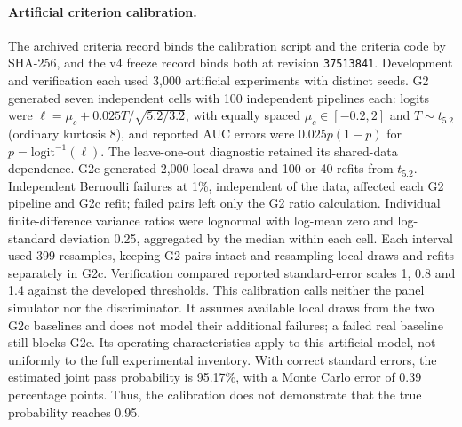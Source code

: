 \paragraph{Artificial criterion calibration.}\label{supp:gate-calibration}
The archived criteria record binds the calibration script and the criteria code by SHA-256, and the v4 freeze record binds both at revision \texttt{37513841}. Development and verification each used 3,000 artificial experiments with distinct seeds. G2 generated seven independent cells with 100 independent pipelines each: logits were $\ell=\mu_c+0.025T/\sqrt{5.2/3.2}$, with equally spaced $\mu_c\in[-0.2,2]$ and $T\sim t_{5.2}$ (ordinary kurtosis 8), and reported AUC errors were $0.025p(1-p)$ for $p=\mathrm{logit}^{-1}(\ell)$. The leave-one-out diagnostic retained its shared-data dependence. G2c generated 2,000 local draws and 100 or 40 refits from $t_{5.2}$. Independent Bernoulli failures at 1\%, independent of the data, affected each G2 pipeline and G2c refit; failed pairs left only the G2 ratio calculation. Individual finite-difference variance ratios were lognormal with log-mean zero and log-standard deviation 0.25, aggregated by the median within each cell. Each interval used 399 resamples, keeping G2 pairs intact and resampling local draws and refits separately in G2c. Verification compared reported standard-error scales 1, 0.8 and 1.4 against the developed thresholds. This calibration calls neither the panel simulator nor the discriminator. It assumes available local draws from the two G2c baselines and does not model their additional failures; a failed real baseline still blocks G2c. Its operating characteristics apply to this artificial model, not uniformly to the full experimental inventory.
With correct standard errors, the estimated joint pass probability is 95.17\%, with a Monte Carlo error of 0.39 percentage points. Thus, the calibration does not demonstrate that the true probability reaches 0.95. %

